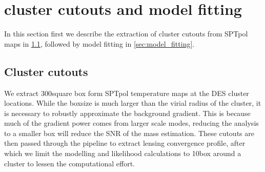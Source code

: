  \section{cluster cutouts and model fitting}
 
 In this section first we describe the extraction of cluster cutouts from SPTpol maps in \ref{sec:cluster_cutouts}, followed by model fitting in \ref{sec:model_fitting}. 
 
 
 \subsection{Cluster cutouts}
 \label{sec:cluster_cutouts}
 We extract 300\arcmin square box form SPTpol temperature maps at the DES cluster locations. 
While the boxsize is much larger than the virial radius of the cluster, it is necessary to robustly approximate the background gradient. 
This is because much of the gradient power comes from larger scale modes, reducing the analysis to a smaller box will reduce the SNR of the mass estimation. 
These cutouts are then passed through the pipeline to extract lensing convergence profile, after which we limit the modelling and likelihood calculations to 10\arcmin box around a cluster to lessen the computational effort.

